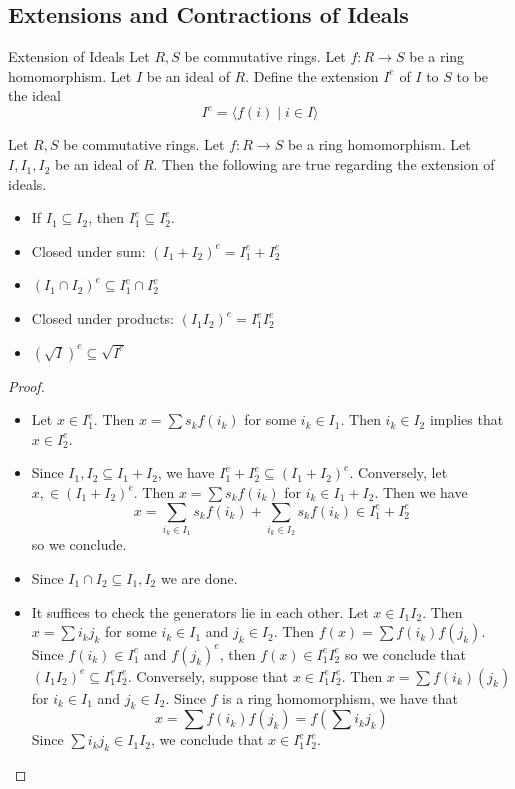 \documentclass[a4paper]{article}
\begin{document}
\subsection{Extensions and Contractions of Ideals}
\begin{defn}{Extension of Ideals}{} Let $R,S$ be commutative rings. Let $f:R\to S$ be a ring homomorphism. Let $I$ be an ideal of $R$. Define the extension $I^e$ of $I$ to $S$ to be the ideal $$I^e=\langle f(i)\;|\;i\in I\rangle$$
\end{defn}

\begin{prp}{}{} Let $R,S$ be commutative rings. Let $f:R\to S$ be a ring homomorphism. Let $I,I_1,I_2$ be an ideal of $R$. Then the following are true regarding the extension of ideals. 
\begin{itemize}
\item If $I_1\subseteq I_2$, then $I_1^e\subseteq I_2^e$. 
\item Closed under sum: $(I_1+I_2)^e=I_1^e+I_2^e$
\item $(I_1\cap I_2)^e\subseteq I_1^e\cap I_2^e$
\item Closed under products: $(I_1I_2)^e=I_1^eI_2^e$
\item $(\sqrt{I})^e\subseteq\sqrt{I^e}$
\end{itemize} 
\begin{proof}\\
\begin{itemize}
\item Let $x\in I_1^e$. Then $x=\sum s_kf(i_k)$ for some $i_k\in I_1$. Then $i_k\in I_2$ implies that $x\in I_2^e$. 
\item Since $I_1,I_2\subseteq I_1+I_2$, we have $I_1^e+I_2^e\subseteq(I_1+I_2)^e$. Conversely, let $x,\in(I_1+I_2)^e$. Then $x=\sum s_kf(i_k)$ for $i_k\in I_1+I_2$. Then we have $$x=\sum_{i_k\in I_1}s_kf(i_k)+\sum_{i_k\in I_2}s_kf(i_k)\in I_1^e+I_2^e$$ so we conclude. 
\item Since $I_1\cap I_2\subseteq I_1,I_2$ we are done. 
\item It suffices to check the generators lie in each other. Let $x\in I_1I_2$. Then $x=\sum i_kj_k$ for some $i_k\in I_1$ and $j_k\in I_2$. Then $f(x)=\sum f(i_k)f(j_k)$. Since $f(i_k)\in I_1^e$ and $f(j_k)^e$, then $f(x)\in I_1^eI_2^e$ so we conclude that $(I_1I_2)^e\subseteq I_1^eI_2^e$. Conversely, suppose that $x\in I_1^eI_2^e$. Then $x=\sum f(i_k)(j_k)$ for $i_k\in I_1$ and $j_k\in I_2$. Since $f$ is a ring homomorphism, we have that $$x=\sum f(i_k)f(j_k)=f\left(\sum i_kj_k\right)$$ Since $\sum i_kj_k\in I_1I_2$, we conclude that $x\in I_1^eI_2^e$. 

\end{itemize}
\end{proof}
\end{prp}
\end{document}
